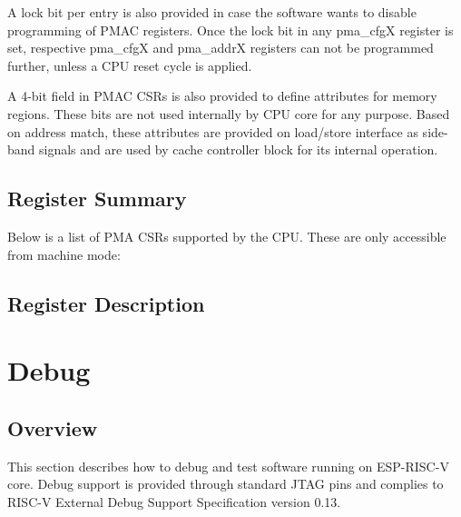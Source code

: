 \documentclass[main\_\_EN.tex]{subfiles}
\begin{document}
A lock bit per entry is also provided in case the software wants to disable programming of PMAC registers. Once the lock bit in any pma\_cfgX register is set, respective pma\_cfgX and pma\_addrX registers can not be programmed further, unless a CPU reset cycle is applied.

A 4-bit field in PMAC CSRs is also provided to define attributes for memory regions. These bits are not used internally by CPU core for any purpose. Based on address match, these attributes are provided on load/store interface as side-band signals and are used by cache controller block for its internal operation.


\clearpage
\hypertarget{riscvcpu-pma-reg-summ}{}
\subsection{Register Summary}
\label{sec:riscvcpu-pma-reg-summ}


Below is a list of PMA CSRs supported by the CPU. These are only accessible from machine mode:




\subsection{Register Description}
\label{sec:riscvcpu-pma-reg-desc}





\clearpage
\section{Debug}
\label{sec:riscvcpu-dbg}



\subsection{Overview}
\label{sec:riscvcpu-dbg-overview}
This section describes how to debug and test software running on ESP-RISC-V core. Debug support is provided through standard JTAG pins and complies to RISC-V External Debug Support Specification version 0.13.
\end{document}
